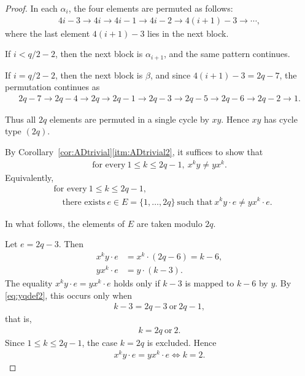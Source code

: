 \documentclass[12pt,reqno]{amsart}
\newcommand{\A}{\alpha}									%
\newcommand{\B}{\beta}									%
\newcommand{\HL}{\vspace{2mm}}							%
\newcommand{\q}{\quad}									%
\theoremstyle{mythmstyle}
\theoremstyle{mydefstyle}
\newcommand{\corref}[1]{Corollary~\ref{#1}}
\numberwithin{equation}{section}
\begin{document}
\begin{proof}
In each $\A_{i}$, the four elements are permuted as follows:
\begin{align}
4i{-}3 \to 4i \to 4i{-}1 \to 4i{-}2 \to 4(i{+}1){-}3 \to \cdots,
\end{align}
where the last element $4(i+1)-3$ lies in the next block. 

If $i < q/2-2$, then the next block is $\A_{i+1}$, and the same pattern continues.

If $i = q/2-2$, then the next block is $\B$, and since $4(i+1)-3 = 2q-7$, the permutation continues as
\begin{align}
2q{-}7 \to 2q{-}4 \to 2q \to 2q{-}1 \to 2q{-}3 \to 2q{-}5 \to 2q{-}6 \to 2q{-}2 \to 1.
\end{align}

Thus all $2q$ elements are permuted in a single cycle by $xy$. Hence $xy$ has cycle type $(2q)$.
\HL

\item[\ref{itm:c2b2-3}]
By \corref{cor:ADtrivial}\ref{itm:ADtrivial2}, it suffices to show that
\begin{align}
\text{for every}\ 1 \le k \le 2q-1,\ x^{k}y \ne yx^{k}.
\end{align}
Equivalently,
\begin{align}
&\text{for every}\ 1 \le k \le 2q-1,\\
\label{eq:2qxkytrivial}
&\q\text{there exists}\ e \in E = \{ 1, \ldots, 2q \}\ \text{such that}\ x^{k}y\cdot e \ne yx^{k}\cdot e.
\end{align}

In what follows, the elements of $E$ are taken modulo $2q$.
\HL

\item[(i)] Let $e = 2q-3$. Then
\begin{align}
x^{k}y\cdot e &= x^{k} \cdot (2q-6) = k-6, \\
yx^{k}\cdot e &= y\cdot(k-3).
\end{align}
The equality $x^{k}y\cdot e = yx^{k}\cdot e$ holds only if
$k-3$ is mapped to $k-6$ by $y$. By \eqref{eq:yqdef2}, this occurs only when
\begin{align}
k -3 = 2q-3\ \text{or}\ 2q-1,
\end{align}
that is,
\begin{align}
k = 2q\ \text{or}\ 2.
\end{align}
Since $1 \le k \le 2q-1$, the case $k = 2q$ is excluded. Hence
\begin{align}
\label{eq:2qxky1}
x^{k}y\cdot e = yx^{k}\cdot e \iff k =2.
\end{align}


\end{proof}
\end{document}
